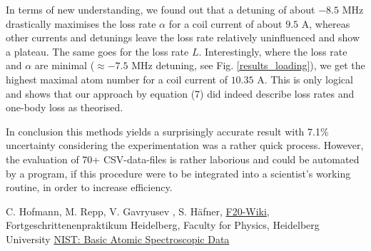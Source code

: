 \documentclass[12pt, a4paper]{article}
\begin{document}
In terms of new understanding, we found out that a detuning of about $-8.5$ MHz drastically maximises the loss rate $\alpha$ for a coil current of about $9.5$ A, whereas other currents and detunings leave the loss rate relatively uninfluenced and show a plateau. The same goes for the loss rate $L$. Interestingly, where the loss rate and $\alpha$ are minimal ($\approx -7.5$ MHz detuning, see Fig. \ref{results_loading}), we get the highest maximal atom number for a coil current of $10.35$ A. This is only logical and shows that our approach by equation (7) did indeed describe loss rates and one-body loss as theorised.

In conclusion this methods yields a surprisingly accurate result with 7.1\% uncertainty considering the experimentation was a rather quick process. However, the evaluation of 70+ CSV-data-files is rather laborious  and could be automated by a program, if this procedure were to be integrated into a scientist's working routine, in order to increase efficiency.


























\newpage 



\begin{thebibliography}{00}   %
 C. Hofmann, M. Repp, V. Gavryusev , S. H\"afner, \href{https://www.physi.uni-heidelberg.de/Forschung/QD/f20wikinew/index.php/Main_Page}{F20-Wiki}, Fortgeschrittenenpraktikum Heidelberg, Faculty for Physics, Heidelberg University
 \href{https://physics.nist.gov/PhysRefData/Handbook/Tables/rubidiumtable1.htm}{NIST: Basic Atomic Spectroscopic Data}

\end{thebibliography}
\end{document}
